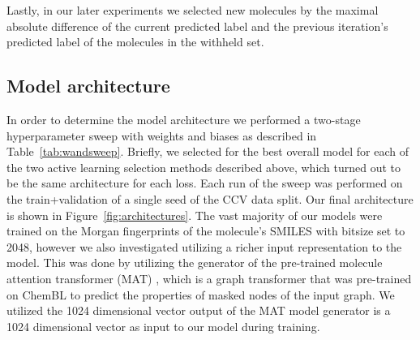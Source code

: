 \documentclass[journal=jmcmar,manuscript=article]{achemso}
\begin{document}
Lastly, in our later experiments we selected new molecules by the maximal absolute difference of the current predicted label and the previous iteration's predicted label of the molecules in the withheld set.

\subsection{Model architecture}
In order to determine the model architecture we performed a two-stage hyperparameter sweep with weights and biases\cite{wandb} as described in Table~\ref{tab:wandsweep}. Briefly, we selected for the best overall model for each of the two active learning selection methods described above, which turned out to be the same architecture for each loss. Each run of the sweep was performed on the train+validation of a single seed of the CCV data split. Our final architecture is shown in Figure~\ref{fig:architectures}. The vast majority of our models were trained on the Morgan fingerprints of the molecule's SMILES with bitsize set to 2048, however we also investigated utilizing a richer input representation to the model. This was done by utilizing the generator of the pre-trained molecule attention transformer (MAT) \cite{MAT}, which is a graph transformer that was pre-trained on ChemBL\cite{Chembl} to predict the properties of masked nodes of the input graph. We utilized the 1024 dimensional vector output of the MAT model generator is a 1024 dimensional vector as input to our model during training.
\end{document}
